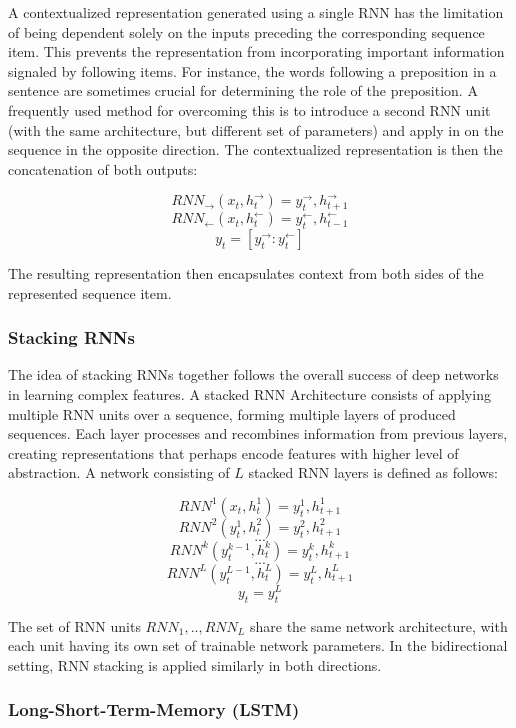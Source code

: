 A contextualized representation generated using a single RNN has the limitation of being dependent solely on the inputs preceding the corresponding sequence item. This prevents the representation from incorporating important information signaled by following items. For instance, the words following a preposition in a sentence are sometimes crucial for determining the role of the preposition. A frequently used method for overcoming this is to introduce a second RNN unit (with the same architecture, but different set of parameters) and apply in on the sequence in the opposite direction. The contextualized representation is then the concatenation of both outputs:

$$ RNN_{\rightarrow}(x_t, h^{\rightarrow}_{t}) = y^{\rightarrow}_t,h^{\rightarrow}_{t + 1} $$
$$ RNN_{\leftarrow}(x_t, h^{\leftarrow}_{t}) = y^{\leftarrow}_t,h^{\leftarrow}_{t - 1} $$
$$ y_t = [y^{\rightarrow}_t:y^{\leftarrow}_t] $$

The resulting representation then encapsulates context from both sides of the represented sequence item.

\subsubsection{Stacking RNNs}

The idea of stacking RNNs together follows the overall success of deep networks in learning complex features. A stacked RNN Architecture consists of applying multiple RNN units over a sequence, forming multiple layers of produced sequences. Each layer processes and recombines information from previous layers, creating representations that perhaps encode features with higher level of abstraction. A network consisting of $L$ stacked RNN layers is defined as follows:

$$ RNN^1(x_t, h^1_t) = y^1_t, h^1_{t+1} $$
$$ RNN^2(y^1_t, h^2_t) = y^2_t, h^2_{t+1} $$
$$ ... $$
$$ RNN^k(y^{k-1}_t, h^k_t) = y^k_t, h^k_{t+1} $$
$$ ... $$
$$ RNN^L(y^{L-1}_t, h^L_t) = y^L_t, h^L_{t+1} $$
$$ y_t = y^L_t $$

The set of RNN units $RNN_1,..,RNN_L$ share the same network architecture, with each unit having its own set of trainable network parameters. In the bidirectional setting, RNN stacking is applied similarly in both directions.

\subsubsection{Long-Short-Term-Memory (LSTM)}


